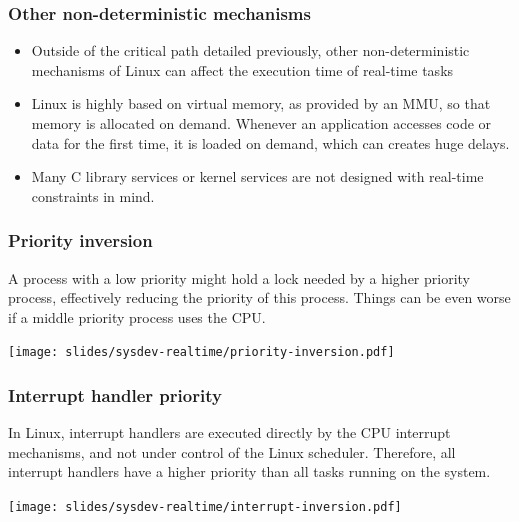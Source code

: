 \begin{frame}
  \frametitle{Other non-deterministic mechanisms}
  \begin{itemize}
  \item Outside of the critical path detailed previously, other
    non-deterministic mechanisms of Linux can affect the execution
    time of real-time tasks
  \item Linux is highly based on virtual memory, as provided by an
    MMU, so that memory is allocated on demand. Whenever an
    application accesses code or data for the first time, it is loaded
    on demand, which can creates huge delays.
  \item Many C library services or kernel services are not designed
    with real-time constraints in mind.
  \end{itemize}
\end{frame}

\begin{frame}
  \frametitle{Priority inversion}

  A process with a low priority might hold a lock needed by a higher
  priority process, effectively reducing the priority of this
  process. Things can be even worse if a middle priority process uses
  the CPU.

  \begin{center}
    \texttt{[image: slides/sysdev-realtime/priority-inversion.pdf]}
  \end{center}
\end{frame}

\begin{frame}
  \frametitle{Interrupt handler priority}

  In Linux, interrupt handlers are executed directly by the CPU
  interrupt mechanisms, and not under control of the Linux
  scheduler. Therefore, all interrupt handlers have a higher priority
  than all tasks running on the system.

  \begin{center}
    \texttt{[image: slides/sysdev-realtime/interrupt-inversion.pdf]}
  \end{center}
\end{frame}

